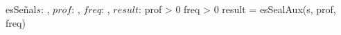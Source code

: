 \documentclass{article}
\begin{document}
\begin{proc}{esSeñal}{\In $s$: \TLista{\ent},
    \In $prof$: \ent,
    \In $freq$: \ent,
    \Out $result$: \bool}{}{
        \pre
        {
            prof > 0 \wedge freq > 0 
        }
    }{
        \post
        { 
            result = \True \Iff esSealAux(s, prof, freq) 
        }
    }

\end{proc}



\end{document}
